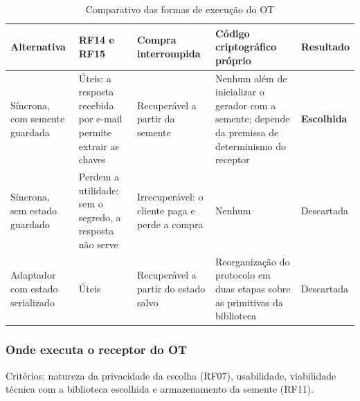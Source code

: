 \begin{table}[H]
\centering
\caption{Comparativo das formas de execução do OT}\label{tab:comp-execucao}
\footnotesize
\renewcommand{\arraystretch}{1.25}
\begin{tabularx}{\textwidth}{@{}>{\raggedright\arraybackslash}p{}
  >{\raggedright\arraybackslash}X >{\raggedright\arraybackslash}X
  >{\raggedright\arraybackslash}X >{\raggedright\arraybackslash}p{}@{}}
\toprule
\textbf{Alternativa} & \textbf{RF14 e RF15} & \textbf{Compra interrompida} &
\textbf{Código criptográfico próprio} & \textbf{Resultado} \\
\midrule
Síncrona, com semente guardada &
Úteis: a resposta recebida por e-mail permite extrair as chaves &
Recuperável a partir da semente &
Nenhum além de inicializar o gerador com a semente; depende da premissa de
determinismo do receptor &
\textbf{Escolhida} \\
\addlinespace
Síncrona, sem estado guardado &
Perdem a utilidade: sem o segredo, a resposta não serve &
Irrecuperável: o cliente paga e perde a compra &
Nenhum &
Descartada \\
\addlinespace
Adaptador com estado serializado &
Úteis &
Recuperável a partir do estado salvo &
Reorganização do protocolo em duas etapas sobre as primitivas da biblioteca &
Descartada \\
\bottomrule
\end{tabularx}
\end{table}


\subsubsection{Onde executa o receptor do OT}

Critérios: natureza da privacidade da escolha (RF07), usabilidade, viabilidade
técnica com a biblioteca escolhida e armazenamento da semente (RF11).


